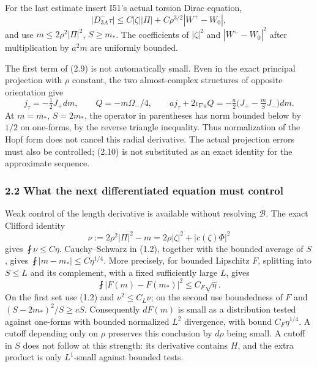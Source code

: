 \documentclass[
  10pt,
]{article}
\begin{document}
For the last estimate insert I51's actual torsion Dirac equation, \[
 |D^-_{3A}\tau|\le C|\zeta||\Pi|
                    +C\rho^{3/2}|W^+-W_0|,
\] and use \(m\le2\rho^2|\Pi|^2\), \(S\ge m_*\). The coefficients of
\(|\zeta|^2\) and \(|W^+-W_0|^2\) after multiplication by \(a^2m\) are
uniformly bounded.

The first term of (2.9) is not automatically small. Even in the exact
principal projection with \(\rho\) constant, the two almost-complex
structures of opposite orientation give \[
 j_\tau=-\tfrac12J_+dm,\qquad Q=-m\Omega_-/4,\qquad
 a j_\tau+2\iota_{\nabla a}Q
     =-\tfrac a2\bigl(J_+-\tfrac mS J_-\bigr)dm.
 \tag{2.10}
\] At \(m=m_*\), \(S=2m_*\), the operator in parentheses has norm
bounded below by \(1/2\) on one-forms, by the reverse triangle
inequality. Thus normalization of the Hopf form does not cancel this
radial derivative. The actual projection errors must also be controlled;
(2.10) is not substituted as an exact identity for the approximate
sequence.

\hypertarget{what-the-next-differentiated-equation-must-control}{%
\subsubsection{2.2 What the next differentiated equation must
control}\label{what-the-next-differentiated-equation-must-control}}

Weak control of the length derivative is available without resolving
\(\mathcal B\). The exact Clifford identity \[
 \nu:=2\rho^2|\Pi|^2-m
       =2\rho|\zeta|^2+|c(\zeta)\Phi|^2
\] gives \(\fint\nu\le C\eta\). Cauchy--Schwarz in (1.2), together with
the bounded average of \(S\), gives \(\fint|m-m_*|\le C\eta^{1/4}\).
More precisely, for bounded Lipschitz \(F\), splitting into \(S\le L\)
and its complement, with a fixed sufficiently large \(L\), gives \[
 \fint |F(m)-F(m_*)|^2\le C_F\sqrt\eta. \tag{2.11}
\] On the first set use (1.2) and \(\nu^2\le C_L\nu\); on the second use
boundedness of \(F\) and \((S-2m_*)^2/S\ge cS\). Consequently \(dF(m)\)
is small as a distribution tested against one-forms with bounded
normalized \(L^2\) divergence, with bound \(C_F\eta^{1/4}\). A cutoff
depending only on \(\rho\) preserves this conclusion by \(d\rho\) being
small. A cutoff in \(S\) does not follow at this strength: its
derivative contains \(H\), and the extra product is only \(L^1\)-small
against bounded tests.
\end{document}
